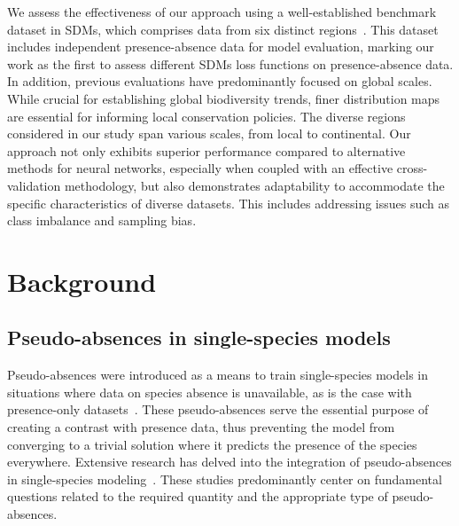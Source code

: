 \documentclass[3p,preprint,12pt]{elsarticle}
\begin{document}
We assess the effectiveness of our approach using a well-established benchmark dataset in SDMs, which comprises data from six distinct regions~\citep{elith2020presence}. This dataset includes independent presence-absence data for model evaluation, marking our work as the first to assess different SDMs loss functions on presence-absence data. In addition, previous evaluations have predominantly focused on global scales. While crucial for establishing global biodiversity trends, finer distribution maps are essential for informing local conservation policies. The diverse regions considered in our study span various scales, from local to continental. Our approach not only exhibits superior performance compared to alternative methods for neural networks, especially when coupled with an effective cross-validation methodology, but also demonstrates adaptability to accommodate the specific characteristics of diverse datasets. This includes addressing issues such as class imbalance and sampling bias.

\section{Background}
\label{sec:background}


\subsection{Pseudo-absences in single-species models}

Pseudo-absences were introduced as a means to train single-species models in situations where data on species absence is unavailable, as is the case with presence-only datasets~\citep{pearce2006modelling}.
These pseudo-absences serve the essential purpose of creating a contrast with presence data, thus preventing the model from converging to a trivial solution where it predicts the presence of the species everywhere.
Extensive research has delved into the integration of pseudo-absences in single-species modeling~\citep{Wisz2009, barbet2012selecting, senay2013novel, jarnevich2017minimizing}. These studies predominantly center on fundamental questions related to the required quantity and the appropriate type of pseudo-absences.
\end{document}
